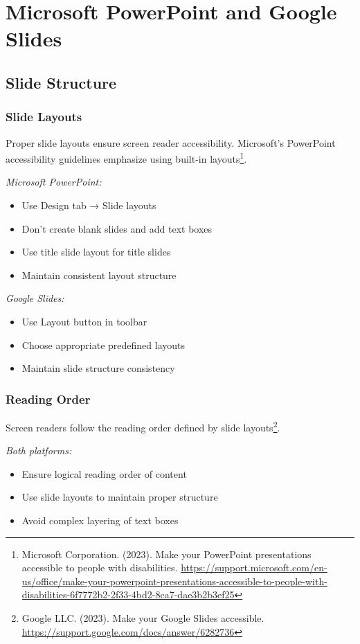 \section{Microsoft PowerPoint and Google Slides}
\label{sec:ppt-google-slides}

\subsection{Slide Structure}

\subsubsection{Slide Layouts}
Proper slide layouts ensure screen reader accessibility. Microsoft's PowerPoint accessibility guidelines emphasize using built-in layouts\footnote{Microsoft Corporation. (2023). Make your PowerPoint presentations accessible to people with disabilities. \url{https://support.microsoft.com/en-us/office/make-your-powerpoint-presentations-accessible-to-people-with-disabilities-6f7772b2-2f33-4bd2-8ca7-dae3b2b3ef25}}.

\emph{Microsoft PowerPoint:}
\begin{itemize}
\item Use Design tab → Slide layouts
\item Don't create blank slides and add text boxes
\item Use title slide layout for title slides
\item Maintain consistent layout structure
\end{itemize}

\emph{Google Slides:}
\begin{itemize}
\item Use Layout button in toolbar
\item Choose appropriate predefined layouts
\item Maintain slide structure consistency
\end{itemize}

\subsubsection{Reading Order}
Screen readers follow the reading order defined by slide layouts\footnote{Google LLC. (2023). Make your Google Slides accessible. \url{https://support.google.com/docs/answer/6282736}}.

\emph{Both platforms:}
\begin{itemize}
\item Ensure logical reading order of content
\item Use slide layouts to maintain proper structure
\item Avoid complex layering of text boxes
\end{itemize}


